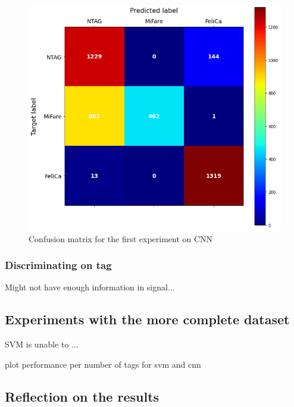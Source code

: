 \begin{figure}[htbp!]
  \centering
  \includegraphics[scale=0.5]{figures/ml_cnnchip512.png}
  \caption{Confusion matrix for the first experiment on CNN}
  \label{fig:cmcnnchip}
\end{figure}

\subsubsection{Discriminating on tag}

Might not have enough information in signal...

\subsection{Experiments with the more complete dataset}

SVM is unable to ...


plot performance per number of tags for svm and cnn


\subsection{Reflection on the results}
